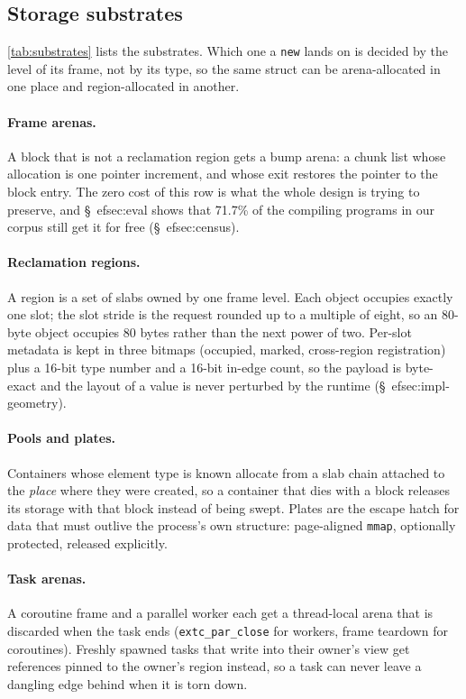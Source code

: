 \subsection{Storage substrates}
\label{sec:substrates}

\tab\ref{tab:substrates} lists the substrates.
Which one a \texttt{new} lands on is decided by the level of its frame, not by its type, so the
same struct can be arena-allocated in one place and region-allocated in another.

\paragraph{Frame arenas.}
A block that is not a reclamation region gets a bump arena: a chunk list whose allocation is one
pointer increment, and whose exit restores the pointer to the block entry.
The zero cost of this row is what the whole design is trying to preserve, and \S\
ef{sec:eval}
shows that 71.7\% of the compiling programs in our corpus still get it for free (\S\
ef{sec:census}).

\paragraph{Reclamation regions.}
A region is a set of slabs owned by one frame level.
Each object occupies exactly one slot; the slot stride is the request rounded up to a multiple of
eight, so an 80-byte object occupies 80 bytes rather than the next power of two.
Per-slot metadata is kept in three bitmaps (occupied, marked, cross-region registration) plus a
16-bit type number and a 16-bit in-edge count, so the payload is byte-exact and the layout of a
value is never perturbed by the runtime (\S\
ef{sec:impl-geometry}).

\paragraph{Pools and plates.}
Containers whose element type is known allocate from a slab chain attached to the \emph{place}
where they were created, so a container that dies with a block releases its storage with that
block instead of being swept.
Plates are the escape hatch for data that must outlive the process's own structure: page-aligned
\texttt{mmap}, optionally protected, released explicitly.

\paragraph{Task arenas.}
A coroutine frame and a parallel worker each get a thread-local arena that is discarded when the
task ends (\texttt{extc\_par\_close} for workers, frame teardown for coroutines).
Freshly spawned tasks that write into their owner's view get references pinned to the owner's
region instead, so a task can never leave a dangling edge behind when it is torn down.

